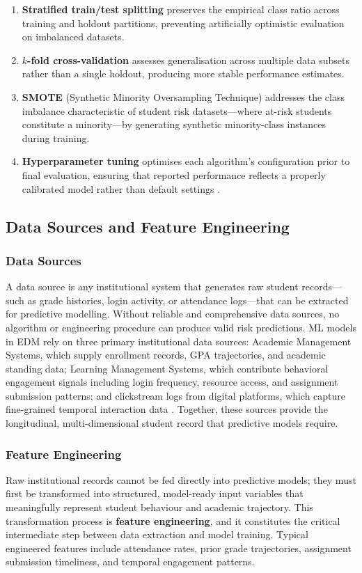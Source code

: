 \documentclass[12pt]{report}
\begin{document}
\begin{enumerate}
    \item \textbf{Stratified train/test splitting} preserves the empirical
    class ratio across training and holdout partitions, preventing
    artificially optimistic evaluation on imbalanced datasets.
    \item \textbf{$k$-fold cross-validation} assesses generalisation across
    multiple data subsets rather than a single holdout, producing more
    stable performance estimates.
    \item \textbf{SMOTE} (Synthetic Minority Oversampling Technique) addresses
    the class imbalance characteristic of student risk datasets---where
    at-risk students constitute a minority---by generating synthetic
    minority-class instances during training.
    \item \textbf{Hyperparameter tuning} optimises each algorithm's
    configuration prior to final evaluation, ensuring that reported
    performance reflects a properly calibrated model rather than
    default settings \parencite{bello2025, aldowah2026}.
\end{enumerate}

\subsection{Data Sources and Feature Engineering}

\subsubsection{Data Sources}
A data source is any institutional system that generates raw
student records---such as grade histories, login activity, or attendance
logs---that can be extracted for predictive modelling. Without reliable
and comprehensive data sources, no algorithm or engineering procedure
can produce valid risk predictions. ML models in EDM rely on three
primary institutional data sources: Academic Management Systems, which
supply enrollment records, GPA trajectories, and academic standing
data; Learning Management Systems, which contribute behavioral
engagement signals including login frequency, resource access, and
assignment submission patterns; and clickstream logs from digital
platforms, which capture fine-grained temporal interaction data
\parencite{kwakye2025}. Together, these sources provide the longitudinal,
multi-dimensional student record that predictive models require.

\subsubsection{Feature Engineering}
Raw institutional records cannot be fed directly into predictive models;
they must first be transformed into structured, model-ready input
variables that meaningfully represent student behaviour and academic
trajectory. This transformation process is \textbf{feature engineering},
and it constitutes the critical intermediate step between data
extraction and model training. Typical engineered features include
attendance rates, prior grade trajectories, assignment submission
timeliness, and temporal engagement patterns.
\end{document}
